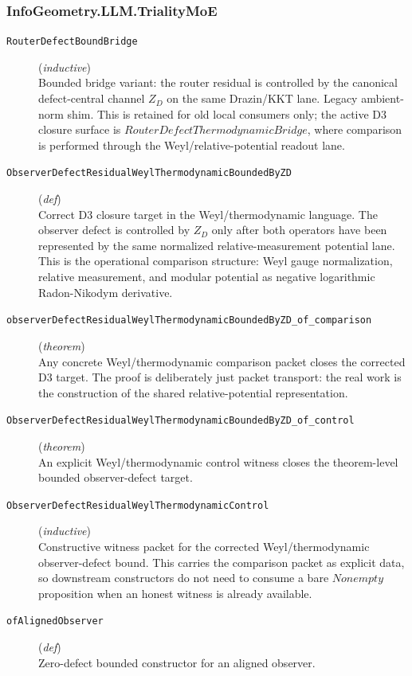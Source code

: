\documentclass[11pt,a4paper]{article}
\begin{document}
\subsubsection*{InfoGeometry.LLM.TrialityMoE}
\begin{description}
  \item[\texttt{RouterDefectBoundBridge}] (\textit{inductive}) \\ Bounded bridge variant: the router residual is controlled by the canonical 
defect-central channel $Z_D$ on the same Drazin/KKT lane. 
Legacy ambient-norm shim. This is retained for old local consumers only; the 
active D3 closure surface is $RouterDefectThermodynamicBridge$, where comparison 
is performed through the Weyl/relative-potential readout lane.
  \item[\texttt{ObserverDefectResidualWeylThermodynamicBoundedByZD}] (\textit{def}) \\ Correct D3 closure target in the Weyl/thermodynamic language. 
The observer defect is controlled by $Z_D$ only after both operators have been 
represented by the same normalized relative-measurement potential lane. This is 
the operational comparison structure: Weyl gauge normalization, relative 
measurement, and modular potential as negative logarithmic Radon-Nikodym 
derivative.
  \item[\texttt{observerDefectResidualWeylThermodynamicBoundedByZD\_of\_comparison}] (\textit{theorem}) \\ Any concrete Weyl/thermodynamic comparison packet closes the corrected D3 
target. The proof is deliberately just packet transport: the real work is the 
construction of the shared relative-potential representation.
  \item[\texttt{ObserverDefectResidualWeylThermodynamicBoundedByZD\_of\_control}] (\textit{theorem}) \\ An explicit Weyl/thermodynamic control witness closes the theorem-level bounded 
observer-defect target.
  \item[\texttt{ObserverDefectResidualWeylThermodynamicControl}] (\textit{inductive}) \\ Constructive witness packet for the corrected Weyl/thermodynamic observer-defect 
bound. This carries the comparison packet as explicit data, so downstream 
constructors do not need to consume a bare $Nonempty$ proposition when an 
honest witness is already available.
  \item[\texttt{ofAlignedObserver}] (\textit{def}) \\ Zero-defect bounded constructor for an aligned observer. 

\end{description}
\end{document}
